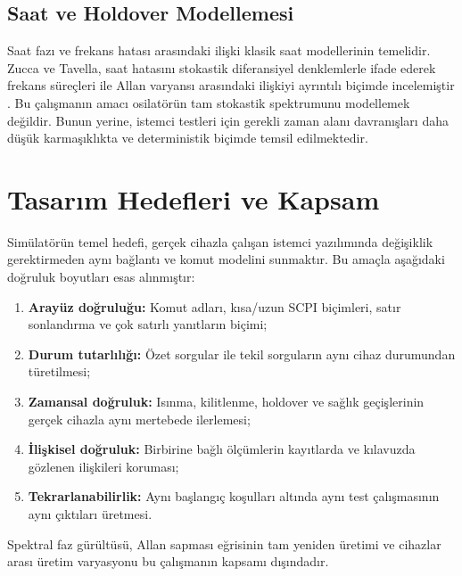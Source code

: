 \documentclass[9pt,twocolumn,a4paper]{extarticle}
\begin{document}
\subsection{Saat ve Holdover Modellemesi}
Saat fazı ve frekans hatası arasındaki ilişki klasik saat modellerinin temelidir. Zucca ve Tavella, saat hatasını stokastik diferansiyel denklemlerle ifade ederek frekans süreçleri ile Allan varyansı arasındaki ilişkiyi ayrıntılı biçimde incelemiştir \cite{zucca2005}. Bu çalışmanın amacı osilatörün tam stokastik spektrumunu modellemek değildir. Bunun yerine, istemci testleri için gerekli zaman alanı davranışları daha düşük karmaşıklıkta ve deterministik biçimde temsil edilmektedir.

\section{Tasarım Hedefleri ve Kapsam}
\label{sec:goals}
Simülatörün temel hedefi, gerçek cihazla çalışan istemci yazılımında değişiklik gerektirmeden aynı bağlantı ve komut modelini sunmaktır. Bu amaçla aşağıdaki doğruluk boyutları esas alınmıştır:
\begin{enumerate}
    \item \textbf{Arayüz doğruluğu:} Komut adları, kısa/uzun SCPI biçimleri, satır sonlandırma ve çok satırlı yanıtların biçimi;
    \item \textbf{Durum tutarlılığı:} Özet sorgular ile tekil sorguların aynı cihaz durumundan türetilmesi;
    \item \textbf{Zamansal doğruluk:} Isınma, kilitlenme, holdover ve sağlık geçişlerinin gerçek cihazla aynı mertebede ilerlemesi;
    \item \textbf{İlişkisel doğruluk:} Birbirine bağlı ölçümlerin kayıtlarda ve kılavuzda gözlenen ilişkileri koruması;
    \item \textbf{Tekrarlanabilirlik:} Aynı başlangıç koşulları altında aynı test çalışmasının aynı çıktıları üretmesi.
\end{enumerate}

Spektral faz gürültüsü, Allan sapması eğrisinin tam yeniden üretimi ve cihazlar arası üretim varyasyonu bu çalışmanın kapsamı dışındadır.
\end{document}
